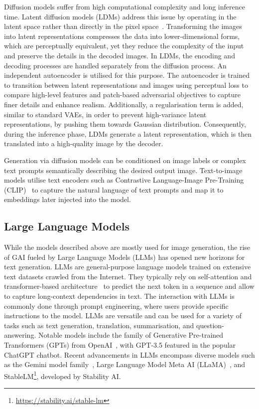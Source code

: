 \documentclass[conference]{IEEEtran}
\begin{document}
Diffusion models suffer from high computational complexity and long inference time. Latent diffusion models (LDMs) address this issue by operating in the latent space rather than directly in the pixel space~\cite{rombach_high-resolution_2022}. Transforming the images into latent representations compresses the data into lower-dimensional forms, which are perceptually equivalent, yet they reduce the complexity of the input and preserve the details in the decoded images.
In LDMs, the encoding and decoding processes are handled separately from the diffusion process. An independent autoencoder is utilised for this purpose. The autoencoder is trained to transition between latent representations and images using perceptual loss to compare high-level features and patch-based adversarial objectives to capture finer details and enhance realism. 
Additionally, a regularisation term is added, similar to standard VAEs, in order to prevent high-variance latent representations, by pushing them towards Gaussian distribution. 
Consequently, during the inference phase, LDMs generate a latent representation, which is then translated into a high-quality image by the decoder.

Generation via diffusion models can be conditioned on image labels or complex text prompts semantically describing the desired output image. Text-to-image models utilise text encoders such as Contrastive Language-Image Pre-Training (CLIP)~\cite{radford_learning_2021} to capture the natural language of text prompts and map it to embeddings later injected into the model.

\subsection{Large Language Models}
While the models described above are mostly used for image generation, the rise of GAI fueled by Large Language Models (LLMs) has opened new horizons for text generation. LLMs are general-purpose language models trained on extensive text datasets crawled from the Internet. They typically rely on self-attention and transformer-based architecture~\cite{vaswani_attention_2017} to predict the next token in a sequence and allow to capture long-context dependencies in text. The interaction with LLMs is commonly done through prompt engineering, where users provide specific instructions to the model. LLMs are versatile and can be used for a variety of tasks such as text generation, translation, summarisation, and question-answering. Notable models include the family of Generative Pre-trained Transformers (GPTs) from OpenAI~\cite{radford_improving_nodate, openai_gpt-4_2023}, with GPT-3.5 featured in the popular ChatGPT chatbot. Recent advancements in LLMs encompass diverse models such as the Gemini model family~\cite{gemini_team_gemini_2023}, Large Language Model Meta AI (LLaMA)~\cite{touvron_llama_2023}, and StableLM\footnote{\url{https://stability.ai/stable-lm}}, developed by Stability AI.
\end{document}
